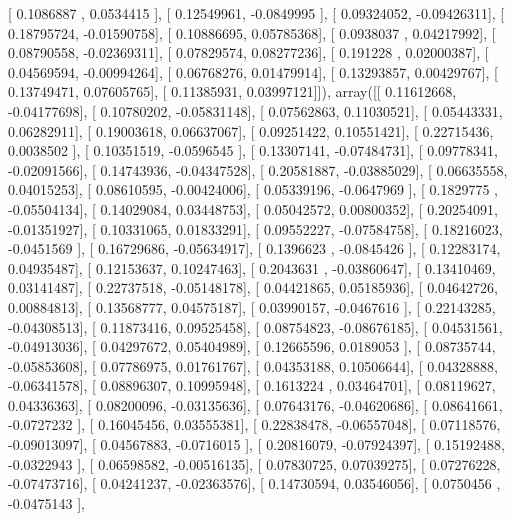 \documentclass{article}
\begin{document}
       [ 0.1086887 ,  0.0534415 ],
       [ 0.12549961, -0.0849995 ],
       [ 0.09324052, -0.09426311],
       [ 0.18795724, -0.01590758],
       [ 0.10886695,  0.05785368],
       [ 0.0938037 ,  0.04217992],
       [ 0.08790558, -0.02369311],
       [ 0.07829574,  0.08277236],
       [ 0.191228  ,  0.02000387],
       [ 0.04569594, -0.00994264],
       [ 0.06768276,  0.01479914],
       [ 0.13293857,  0.00429767],
       [ 0.13749471,  0.07605765],
       [ 0.11385931,  0.03997121]]), array([[ 0.11612668, -0.04177698],
       [ 0.10780202, -0.05831148],
       [ 0.07562863,  0.11030521],
       [ 0.05443331,  0.06282911],
       [ 0.19003618,  0.06637067],
       [ 0.09251422,  0.10551421],
       [ 0.22715436,  0.0038502 ],
       [ 0.10351519, -0.0596545 ],
       [ 0.13307141, -0.07484731],
       [ 0.09778341, -0.02091566],
       [ 0.14743936, -0.04347528],
       [ 0.20581887, -0.03885029],
       [ 0.06635558,  0.04015253],
       [ 0.08610595, -0.00424006],
       [ 0.05339196, -0.0647969 ],
       [ 0.1829775 , -0.05504134],
       [ 0.14029084,  0.03448753],
       [ 0.05042572,  0.00800352],
       [ 0.20254091, -0.01351927],
       [ 0.10331065,  0.01833291],
       [ 0.09552227, -0.07584758],
       [ 0.18216023, -0.0451569 ],
       [ 0.16729686, -0.05634917],
       [ 0.1396623 , -0.0845426 ],
       [ 0.12283174,  0.04935487],
       [ 0.12153637,  0.10247463],
       [ 0.2043631 , -0.03860647],
       [ 0.13410469,  0.03141487],
       [ 0.22737518, -0.05148178],
       [ 0.04421865,  0.05185936],
       [ 0.04642726,  0.00884813],
       [ 0.13568777,  0.04575187],
       [ 0.03990157, -0.0467616 ],
       [ 0.22143285, -0.04308513],
       [ 0.11873416,  0.09525458],
       [ 0.08754823, -0.08676185],
       [ 0.04531561, -0.04913036],
       [ 0.04297672,  0.05404989],
       [ 0.12665596,  0.0189053 ],
       [ 0.08735744, -0.05853608],
       [ 0.07786975,  0.01761767],
       [ 0.04353188,  0.10506644],
       [ 0.04328888, -0.06341578],
       [ 0.08896307,  0.10995948],
       [ 0.1613224 ,  0.03464701],
       [ 0.08119627,  0.04336363],
       [ 0.08200096, -0.03135636],
       [ 0.07643176, -0.04620686],
       [ 0.08641661, -0.0727232 ],
       [ 0.16045456,  0.03555381],
       [ 0.22838478, -0.06557048],
       [ 0.07118576, -0.09013097],
       [ 0.04567883, -0.0716015 ],
       [ 0.20816079, -0.07924397],
       [ 0.15192488, -0.0322943 ],
       [ 0.06598582, -0.00516135],
       [ 0.07830725,  0.07039275],
       [ 0.07276228, -0.07473716],
       [ 0.04241237, -0.02363576],
       [ 0.14730594,  0.03546056],
       [ 0.0750456 , -0.0475143 ],
\end{document}
